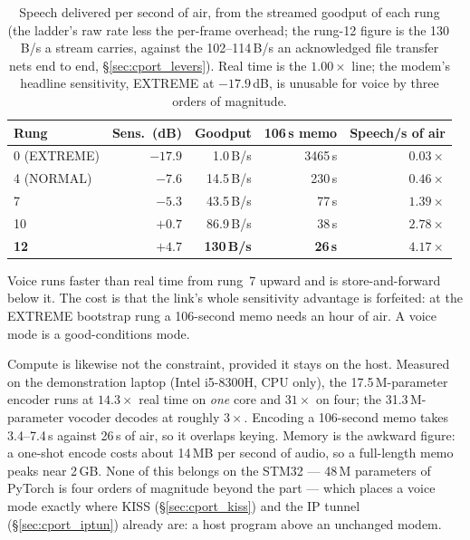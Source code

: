 \begin{table}[H]
    \centering
    \caption{Speech delivered per second of air, from the streamed
             goodput of each rung (the ladder's raw rate less the
             per-frame overhead; the rung-12 figure is the 130\,B/s a
             stream carries, against the 102--114\,B/s an
             acknowledged file transfer nets end to end,
             \S\ref{sec:cport_levers}).  Real time is the $1.00\times$
             line;
             the modem's headline sensitivity, EXTREME at
             $-17.9$\,dB, is unusable for voice by three orders of
             magnitude.}
    \label{tab:voice_rate}
    \small
    \begin{tabular}{@{}lrrrr@{}}
    \toprule
    \textbf{Rung} & \textbf{Sens.\ (dB)} & \textbf{Goodput} &
    \textbf{106\,s memo} & \textbf{Speech/s of air} \\
    \midrule
    0 (EXTREME)  & $-17.9$ &   1.0\,B/s & 3465\,s & $0.03\times$ \\
    4 (NORMAL)   & $-7.6$  &  14.5\,B/s &  230\,s & $0.46\times$ \\
    7            & $-5.3$  &  43.5\,B/s &   77\,s & $1.39\times$ \\
    10           & $+0.7$  &  86.9\,B/s &   38\,s & $2.78\times$ \\
    \textbf{12}  & $+4.7$  & \textbf{130\,B/s} & \textbf{26\,s} &
    $\mathbf{4.17\times}$ \\
    \bottomrule
    \end{tabular}
\end{table}

Voice runs faster than real time from rung~7 upward and is
store-and-forward below it.  The cost is that the link's whole
sensitivity advantage is forfeited: at the EXTREME bootstrap rung a
106-second memo needs an hour of air.  A voice mode is a
good-conditions mode.

Compute is likewise not the constraint, provided it stays on the host.
Measured on the demonstration laptop (Intel i5-8300H, CPU only), the
17.5\,M-parameter encoder runs at $14.3\times$ real time on
\emph{one} core and $31\times$ on four; the 31.3\,M-parameter vocoder
decodes at roughly $3\times$.  Encoding a 106-second memo takes
3.4--7.4\,s against 26\,s of air, so it overlaps keying.  Memory is the
awkward figure: a one-shot encode costs about 14\,MB per second of
audio, so a full-length memo peaks near 2\,GB.  None of this belongs on
the STM32 --- 48\,M parameters of PyTorch is four orders of magnitude
beyond the part --- which places a voice mode exactly where KISS
(\S\ref{sec:cport_kiss}) and the IP tunnel (\S\ref{sec:cport_iptun})
already are: a host program above an unchanged modem.

